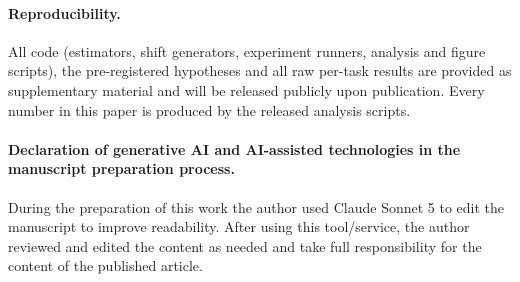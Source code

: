 \paragraph{Reproducibility.}
All code (estimators, shift generators, experiment runners, analysis and figure scripts), the pre-registered hypotheses and all raw per-task results are provided as supplementary material and will be released publicly upon publication. Every number in this paper is produced by the released analysis scripts.

\paragraph{Declaration of generative AI and AI-assisted technologies in the manuscript preparation process.}
During the preparation of this work the author used Claude Sonnet 5 to edit the manuscript to improve readability. After using this tool/service, the author reviewed and edited the content as needed and take full responsibility for the content of the published article.
